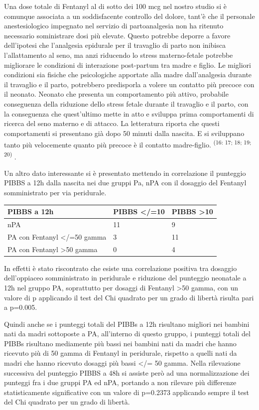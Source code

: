 \documentclass[]{article}
\begin{document}
Una dose totale di Fentanyl al di sotto dei 100 mcg nel nostro studio si
è comunque associata a un soddisfacente controllo del dolore, tant'è che
il personale anestesiologico impegnato nel servizio di partoanalgesia
non ha ritenuto necessario soministrare dosi più elevate. Questo
potrebbe deporre a favore dell'ipotesi che l'analgesia epidurale per il
travaglio di parto non inibisca l'allattamento al seno, ma anzi
riducendo lo stress materno-fetale potrebbe migliorare le condizioni di
interazione post-partum tra madre e figlio. Le migliori condizioni sia
fisiche che psicologiche apportate alla madre dall'analgesia durante il
travaglio e il parto, potrebbero predisporla a volere un contatto più
precoce con il neonato. Neonato che presenta un comportamento più
attivo, probabile conseguenza della riduzione dello stress fetale
durante il travaglio e il parto, con la conseguenza che quest'ultimo
mette in atto e sviluppa prima comportamenti di ricerca del seno materno
e di attacco. La letteratura riporta che questi comportamenti si
presentano già dopo 50 minuti dalla nascita. E si sviluppano tanto più
velocemente quanto più precoce è il contatto madre-figlio.
\textsuperscript{(16: 17; 18; 19; 20)} .

Un altro dato interessante si è presentato mettendo in correlazione il
punteggio PIBBS a 12h dalla nascita nei due gruppi Pa, nPA con il
dosaggio del Fentanyl somministrato per via peridurale.

\begin{longtable}[]{@{}lll@{}}
\toprule
PIBBS a 12h & PIBBS \textless{}/=10 & PIBBS
\textgreater{}10\tabularnewline
\midrule
\endhead
nPA & 11 & 9\tabularnewline
PA con Fentanyl \textless{}/=50 gamma & 3 & 11\tabularnewline
PA con Fentanyl \textgreater{}50 gamma & 0 & 4\tabularnewline
\bottomrule
\end{longtable}

In effetti è stato riscontrato che esiste una correlazione positiva tra
dosaggio dell'oppiaceo somministrato in peridurale e riduzione del
punteggio neonatale a 12h nel gruppo PA, soprattutto per dosaggi di
Fentanyl \textgreater{}50 gamma, con un valore di p applicando il test
del Chi quadrato per un grado di libertà risulta pari a p=0.005.

Quindi anche se i punteggi totali del PIBBs a 12h risultano migliori nei
bambini nati da madri sottoposte a PA, all'interno di questo gruppo, i
punteggi totali del PIBBs risultano mediamente più bassi nei bambini
nati da madri che hanno ricevuto più di 50 gamma di Fentanyl in
peridurale, rispetto a quelli nati da madri che hanno ricevuto dosaggi
più bassi \textless{}/= 50 gamma. Nella rilevazione successiva del
punteggio PIBBS a 48h si assiste però ad una normalizzazione dei
punteggi fra i due gruppi PA ed nPA, portando a non rilevare più
differenze statisticamente significative con un valore di p=0.2373
applicando sempre il test del Chi quadrato per un grado di libertà.
\end{document}
